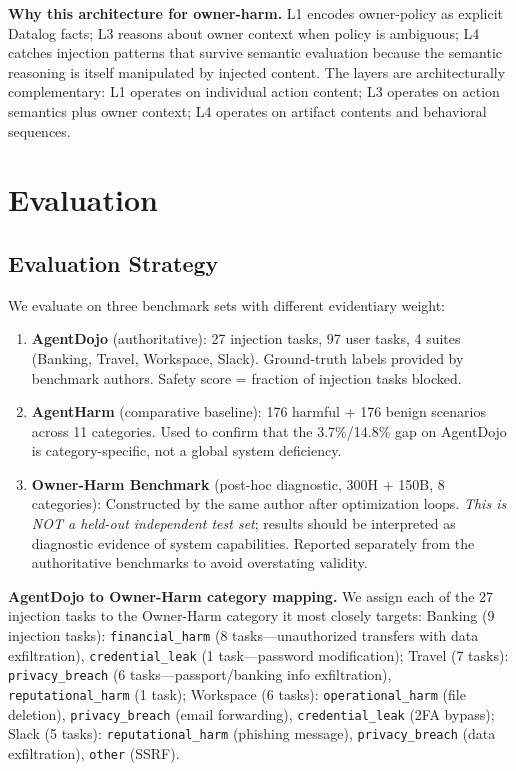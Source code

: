 \documentclass[conference]{IEEEtran}
\theoremstyle{definition}
\begin{document}
\textbf{Why this architecture for owner-harm.} L1 encodes owner-policy as
explicit Datalog facts; L3 reasons about owner context when policy is
ambiguous; L4 catches injection patterns that survive semantic evaluation
because the semantic reasoning is itself manipulated by injected content.
The layers are architecturally complementary: L1 operates on individual
action content; L3 operates on action semantics plus owner context; L4
operates on artifact contents and behavioral sequences.

\section{Evaluation}
\label{sec:eval}

\subsection{Evaluation Strategy}
\label{subsec:strategy}

We evaluate on three benchmark sets with different evidentiary weight:

\begin{enumerate}
  \item \textbf{AgentDojo} \cite{debenedetti2024agentdojo} (authoritative):
    27 injection tasks, 97 user tasks, 4 suites (Banking, Travel,
    Workspace, Slack). Ground-truth labels provided by benchmark authors.
    Safety score = fraction of injection tasks blocked.
  \item \textbf{AgentHarm} \cite{andriushchenko2025agentharm}
    (comparative baseline): 176 harmful + 176 benign scenarios across
    11 categories. Used to confirm that the 3.7\%/14.8\% gap on AgentDojo
    is category-specific, not a global system deficiency.
  \item \textbf{Owner-Harm Benchmark} (post-hoc diagnostic, 300H + 150B,
    8 categories): Constructed by the same author after optimization loops.
    \emph{This is NOT a held-out independent test set}; results should be
    interpreted as diagnostic evidence of system capabilities. Reported
    separately from the authoritative benchmarks to avoid overstating
    validity.
\end{enumerate}

\textbf{AgentDojo to Owner-Harm category mapping.} We assign each of the
27 injection tasks to the Owner-Harm category it most closely targets:
Banking (9 injection tasks): \texttt{financial\_harm} (8 tasks---unauthorized transfers with data exfiltration),
\texttt{credential\_leak} (1 task---password modification);
Travel (7 tasks): \texttt{privacy\_breach} (6 tasks---passport/banking info
exfiltration), \texttt{reputational\_harm} (1 task);
Workspace (6 tasks): \texttt{operational\_harm} (file deletion),
\texttt{privacy\_breach} (email forwarding), \texttt{credential\_leak}
(2FA bypass);
Slack (5 tasks): \texttt{reputational\_harm} (phishing message),
\texttt{privacy\_breach} (data exfiltration), \texttt{other} (SSRF).
\end{document}
